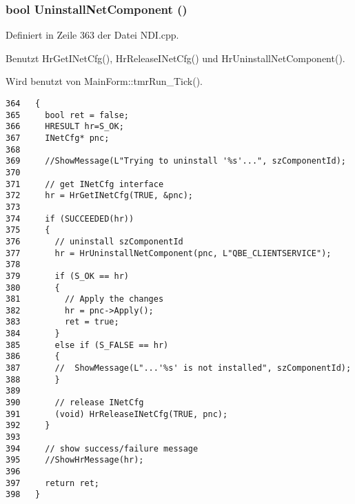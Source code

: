 \hypertarget{classQbeNDI_1_1NetConfig_QbeNDI_1_1NetConfige1}{
\subsubsection[UninstallNetComponent]{\setlength{\rightskip}{0pt plus 5cm}bool Uninstall\-Net\-Component ()}}
\label{classQbeNDI_1_1NetConfig_QbeNDI_1_1NetConfige1}




Definiert in Zeile 363 der Datei NDI.cpp.

Benutzt Hr\-Get\-INet\-Cfg(), Hr\-Release\-INet\-Cfg() und Hr\-Uninstall\-Net\-Component().

Wird benutzt von Main\-Form::tmr\-Run\_\-Tick().



\footnotesize\begin{verbatim}364   {
365     bool ret = false;
366     HRESULT hr=S_OK;
367     INetCfg* pnc;
368 
369     //ShowMessage(L"Trying to uninstall '%s'...", szComponentId);
370 
371     // get INetCfg interface
372     hr = HrGetINetCfg(TRUE, &pnc);
373 
374     if (SUCCEEDED(hr))
375     {
376       // uninstall szComponentId
377       hr = HrUninstallNetComponent(pnc, L"QBE_CLIENTSERVICE");
378 
379       if (S_OK == hr)
380       {
381         // Apply the changes
382         hr = pnc->Apply();
383         ret = true;
384       }
385       else if (S_FALSE == hr)
386       {
387       //  ShowMessage(L"...'%s' is not installed", szComponentId);
388       }
389 
390       // release INetCfg
391       (void) HrReleaseINetCfg(TRUE, pnc);
392     }
393 
394     // show success/failure message
395     //ShowHrMessage(hr);
396 
397     return ret;
398   }
\end{verbatim}\normalsize 
